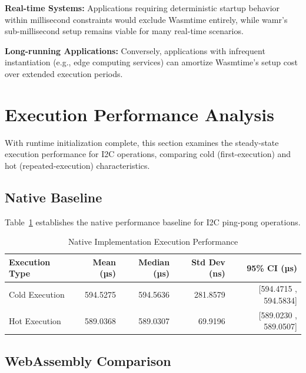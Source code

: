 \textbf{Real-time Systems:} Applications requiring deterministic startup behavior within millisecond constraints would exclude Wasmtime entirely, while \acrshort{wamr}'s sub-millisecond setup remains viable for many real-time scenarios.

\textbf{Long-running Applications:} Conversely, applications with infrequent instantiation (e.g., edge computing services) can amortize Wasmtime's setup cost over extended execution periods.

\section{Execution Performance Analysis}
\label{sec:eval-execution}

With runtime initialization complete, this section examines the steady-state execution performance for I2C operations, comparing cold (first-execution) and hot (repeated-execution) characteristics.

\subsection{Native Baseline}
\label{subsec:eval-execution-native}

Table~\ref{tab:native-execution} establishes the native performance baseline for I2C ping-pong operations.

\begin{table}[htbp]
    \centering
    \caption{Native Implementation Execution Performance}
    \label{tab:native-execution}
    \begin{tabular}{lrrrr}
        \toprule
        \textbf{Execution Type} & \textbf{Mean (µs)} & \textbf{Median (µs)} & \textbf{Std Dev (ns)} & \textbf{95\% CI (µs)} \\
        \midrule
        Cold Execution  & 594.5275 & 594.5636 & 281.8579 & [594.4715 , 594.5834] \\
        Hot Execution   & 589.0368 & 589.0307 & 69.9196 & [589.0230 , 589.0507] \\
    \end{tabular}
\end{table}


\subsection{WebAssembly Comparison}
\label{subsec:eval-execution-wasm}

